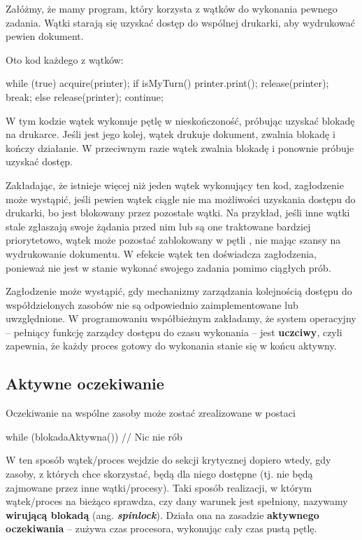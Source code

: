 \begin{example}
    Załóżmy, że mamy program, który korzysta z wątków do wykonania pewnego zadania. Wątki starają się uzyskać dostęp do wspólnej drukarki, aby wydrukować pewien dokument.

    Oto kod każdego z wątków:
    \begin{java}
        while (true) {
            acquire(printer);
            if isMyTurn() {
                printer.print();
                release(printer);
                break;
            } else {
                release(printer);
                continue;
            }
        }
    \end{java}

    W tym kodzie wątek wykonuje pętlę w nieskończoność, próbując uzyskać blokadę na drukarce. Jeśli jest jego kolej, wątek drukuje dokument, zwalnia blokadę i kończy działanie. W przeciwnym razie wątek zwalnia blokadę i ponownie próbuje uzyskać dostęp.

    Zakładając, że istnieje więcej niż jeden wątek wykonujący ten kod, zagłodzenie może wystąpić, jeśli pewien wątek ciągle nie ma możliwości uzyskania dostępu do drukarki, bo jest blokowany przez pozostałe wątki. Na przykład, jeśli inne wątki stale zgłaszają swoje żądania przed nim lub są one traktowane bardziej priorytetowo, wątek może pozostać zablokowany w pętli , nie mając szansy na wydrukowanie dokumentu. W efekcie wątek ten doświadcza zagłodzenia, ponieważ nie jest w stanie wykonać swojego zadania pomimo ciągłych prób.
\end{example}

Zagłodzenie może wystąpić, gdy mechanizmy zarządzania kolejnością dostępu do współdzielonych zasobów nie są odpowiednio zaimplementowane lub uwzględnione. W programowaniu współbieżnym zakładamy, że system operacyjny -- pełniący funkcję zarządcy dostępu do czasu wykonania -- jest \textbf{uczciwy}, czyli zapewnia, że każdy proces gotowy do wykonania stanie się w końcu aktywny.

\subsection{Aktywne oczekiwanie}

Oczekiwanie na wspólne zasoby może zostać zrealizowane w postaci
\begin{java}
    while (blokadaAktywna()) {
        // Nic nie rób
    }
\end{java}
W ten sposób wątek/proces wejdzie do sekcji krytycznej dopiero wtedy, gdy zasoby, z których chce skorzystać, będą dla niego dostępne (tj. nie będą zajmowane przez inne wątki/procesy). Taki sposób realizacji, w którym wątek/proces na bieżąco sprawdza, czy dany warunek jest spełniony, nazywamy \textbf{wirującą blokadą} (ang. \textbf{\textit{spinlock}}). Działa ona na zasadzie \textbf{aktywnego oczekiwania} -- zużywa czas procesora, wykonując cały czas pustą pętlę.

